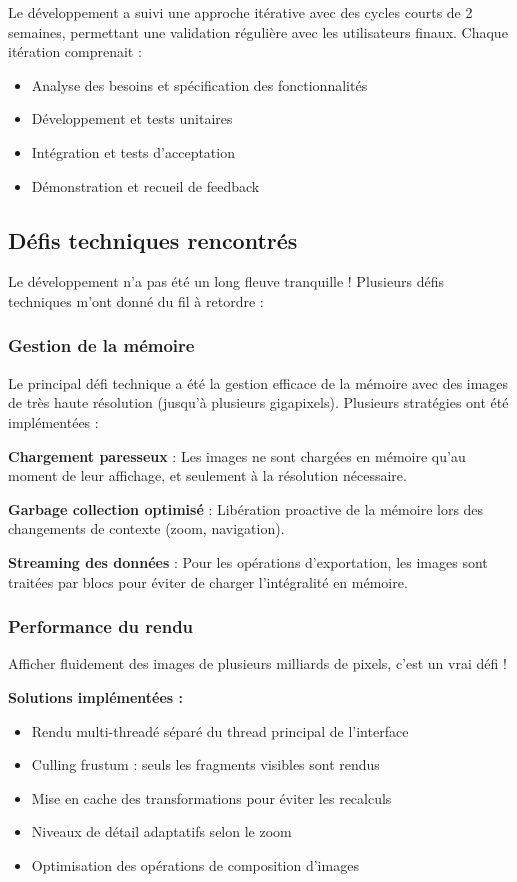 \documentclass[11pt,a4paper]{report}
\begin{document}
Le développement a suivi une approche itérative avec des cycles courts de 2 semaines, permettant une validation régulière avec les utilisateurs finaux. Chaque itération comprenait :
\begin{itemize}
\item Analyse des besoins et spécification des fonctionnalités
\item Développement et tests unitaires
\item Intégration et tests d'acceptation
\item Démonstration et recueil de feedback
\end{itemize}

\subsection{Défis techniques rencontrés}

Le développement n'a pas été un long fleuve tranquille ! Plusieurs défis techniques m'ont donné du fil à retordre :

\subsubsection{Gestion de la mémoire}

Le principal défi technique a été la gestion efficace de la mémoire avec des images de très haute résolution (jusqu'à plusieurs gigapixels). Plusieurs stratégies ont été implémentées :

\textbf{Chargement paresseux} : Les images ne sont chargées en mémoire qu'au moment de leur affichage, et seulement à la résolution nécessaire.

\textbf{Garbage collection optimisé} : Libération proactive de la mémoire lors des changements de contexte (zoom, navigation).

\textbf{Streaming des données} : Pour les opérations d'exportation, les images sont traitées par blocs pour éviter de charger l'intégralité en mémoire.

\subsubsection{Performance du rendu}

Afficher fluidement des images de plusieurs milliards de pixels, c'est un vrai défi !

\textbf{Solutions implémentées :}
\begin{itemize}
\item Rendu multi-threadé séparé du thread principal de l'interface
\item Culling frustum : seuls les fragments visibles sont rendus
\item Mise en cache des transformations pour éviter les recalculs
\item Niveaux de détail adaptatifs selon le zoom
\item Optimisation des opérations de composition d'images
\end{itemize}
\end{document}
